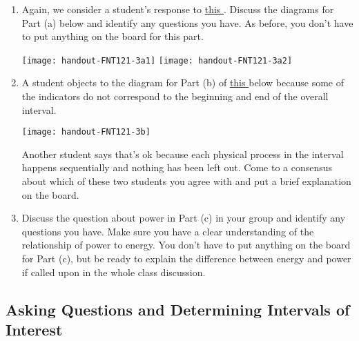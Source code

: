 \begin{FNTenv}
	
\end{FNTenv}


\begin{enumerate}[1.]

	\item Again, we consider a student's response to \hyperref[\FNT1.2.1-3]{this \FNT}. Discuss the diagrams for Part (a) below and identify any questions you have. As before, you don't have to put anything on the board for this part.
	
		\texttt{[image: handout-FNT121-3a1]}
		\;
		\texttt{[image: handout-FNT121-3a2]}
	
	\item A student objects to the diagram for Part (b) of \hyperref[\FNT1.2.1-3]{this \FNT} below because some of the indicators do not correspond to the beginning and end of the overall interval.
	
		\texttt{[image: handout-FNT121-3b]}
		
		Another student says that's ok because each physical process in the interval happens sequentially and nothing has been left out. Come to a consensus about which of these two students you agree with and put a brief explanation on the board.
	
	\item Discuss the question about power in Part (c) in your group and identify any questions you have. Make sure you have a clear understanding of the relationship of power to energy. You don't have to put anything on the board for Part (c), but be ready to explain the difference between energy and power if called upon in the whole class discussion.

\WCD

\end{enumerate}

\subsection{Asking Questions and Determining Intervals of Interest}
\label{act1.2.2D}

\begin{FNTenv}
	
\end{FNTenv}


